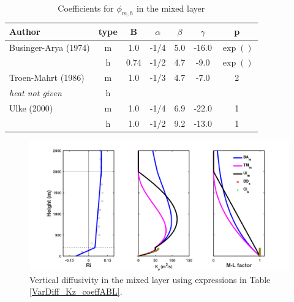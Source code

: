 \small
\begin{table}[htbp]
\begin{center}
\begin{tabular}{| l | c | c | c | c | c | c |}
\hline
Author & type & B & $\alpha$ & $\beta$ & $\gamma$ & p \\
\hline
Businger-Arya (1974) \cite{Businger1974} & m & 1.0  & -1/4 & 5.0 & -16.0 & $\exp()$ \\
                                         & h & 0.74 & -1/2 & 4.7 & -9.0 & $\exp()$ \\
\hline
Troen-Mahrt (1986)   \cite{Troen1986}    & m & 1.0 & -1/3 & 4.7 & -7.0  & 2 \\
\textit{heat not given}                  & h &     &      &     &       &   \\
\hline
Ulke (2000)          \cite{Ulke2000}     & m & 1.0 & -1/4 & 6.9 & -22.0 & 1 \\
                                         & h & 1.0 & -1/2 & 9.2 & -13.0 & 1 \\
\hline
\end{tabular}
\caption{\label{tab:VarDiff_Kz_coeffABL}Coefficients for $\phi_{m,h}$ in the mixed layer}
\end{center}
\end{table}
\normalsize

\begin{figure}[htbp]\vspace*{0cm}\hspace*{0cm}
\includegraphics[angle=0,scale=0.5]{Figures/Apx_VarDiff/Kv_ML.png}
\parbox{15cm}{\caption{\label{FigVarDiff_Kv_MixingLayer}
Vertical diffusivity in the mixed layer using expressions in Table \ref{VarDiff_Kz_coeffABL}.
}}
\end{figure}



